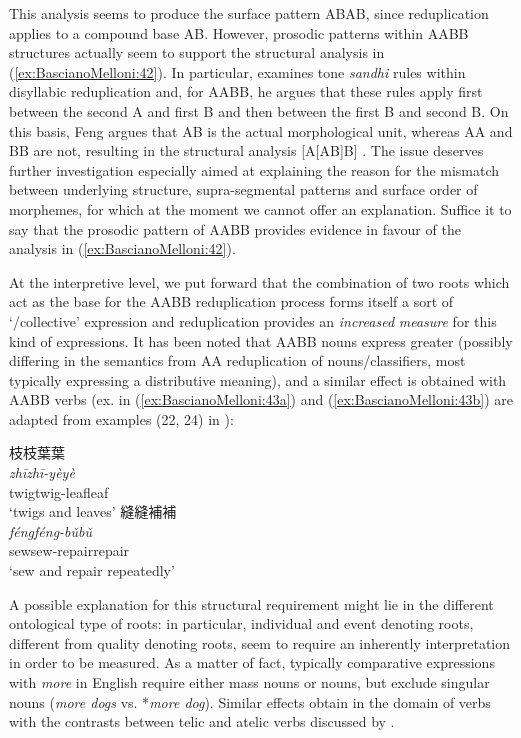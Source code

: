 \documentclass[output=paper]{langsci/langscibook}
\begin{document}
This analysis seems to produce the surface pattern ABAB, since
reduplication applies to a compound base AB. However, prosodic patterns
within AABB structures actually seem to support the structural analysis
in (\ref{ex:BascianoMelloni:42}). In particular, %
\citet{Feng2003} %
%
examines tone \emph{sandhi} rules
within disyllabic reduplication and, for AABB, he argues that these
rules apply first between the second A and first B and then between the
first B and second B. On this basis, Feng argues that AB is the actual
morphological unit, whereas AA and BB are not, resulting in the
structural analysis {[}A{[}AB{]}B{]} %
\citep[7-8]{Feng2003}%
%
. The issue
deserves further investigation especially aimed at explaining the reason
for the mismatch between underlying structure, supra-segmental patterns
and surface order of morphemes, for which at the moment we cannot offer
an explanation. Suffice it to say that the prosodic pattern of AABB provides
evidence in favour of the analysis in (\ref{ex:BascianoMelloni:42}).

At the interpretive level, we put forward that the combination of two
roots which act as the base for the AABB reduplication process forms
itself a sort of `/collective' expression and reduplication
provides an \emph{increased} \emph{measure} for this kind of
expressions. It has been noted that AABB nouns express greater 
(possibly differing in the semantics from AA reduplication of
nouns/classifiers, most typically expressing a distributive meaning),
and a similar effect is obtained with AABB verbs (ex. in (\ref{ex:BascianoMelloni:43a}) and (\ref{ex:BascianoMelloni:43b})
are adapted from examples (22, 24) in \citealt{Zhang2015}):

 \ea\label{ex:BascianoMelloni:43}
 \ea\label{ex:BascianoMelloni:43a} 枝枝葉葉 \\
 \gll \emph{zhī\tld{}zhī-yè\tld{}yè}\\
twig\tld{}twig-leaf\tld{}leaf\\
\glt `twigs and leaves'
\ex\label{ex:BascianoMelloni:43b}
 縫縫補補\\
 \gll \emph{féng\tld{}féng-bǔ\tld{}bǔ}\\
sew\tld{}sew-repair\tld{}repair\\
\glt `sew and repair repeatedly'
\z\z

A possible explanation for this structural requirement might lie in the
different ontological type of roots: in particular, individual and event
denoting roots, different from quality denoting roots, seem to require
an inherently  interpretation in order to be measured. As a matter
of fact, typically comparative expressions with \emph{more} in English
require either mass nouns or  nouns, but exclude singular nouns
(\emph{more dogs} vs. *\emph{more dog}). Similar effects obtain in the
domain of verbs with the contrasts between telic and atelic verbs
discussed by %
\citet{Wellwood2015}%
%
.
\end{document}
